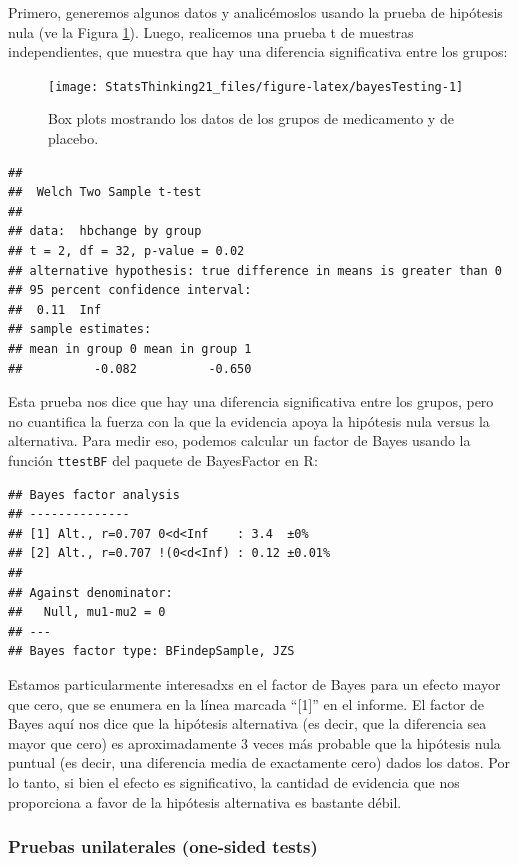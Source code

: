 \documentclass[
  12pt,
]{book}
\begin{document}
Primero, generemos algunos datos y analicémoslos usando la prueba de hipótesis nula (ve la Figura \ref{fig:bayesTesting}). Luego, realicemos una prueba t de muestras independientes, que muestra que hay una diferencia significativa entre los grupos:

\begin{figure}
\texttt{[image: StatsThinking21\_files/figure-latex/bayesTesting-1]} \caption{Box plots mostrando los datos de los grupos de medicamento y de placebo.}\label{fig:bayesTesting}
\end{figure}

\begin{verbatim}
## 
##  Welch Two Sample t-test
## 
## data:  hbchange by group
## t = 2, df = 32, p-value = 0.02
## alternative hypothesis: true difference in means is greater than 0
## 95 percent confidence interval:
##  0.11  Inf
## sample estimates:
## mean in group 0 mean in group 1 
##          -0.082          -0.650
\end{verbatim}

Esta prueba nos dice que hay una diferencia significativa entre los grupos, pero no cuantifica la fuerza con la que la evidencia apoya la hipótesis nula versus la alternativa. Para medir eso, podemos calcular un factor de Bayes usando la función \texttt{ttestBF} del paquete de BayesFactor en R:

\begin{verbatim}
## Bayes factor analysis
## --------------
## [1] Alt., r=0.707 0<d<Inf    : 3.4  ±0%
## [2] Alt., r=0.707 !(0<d<Inf) : 0.12 ±0.01%
## 
## Against denominator:
##   Null, mu1-mu2 = 0 
## ---
## Bayes factor type: BFindepSample, JZS
\end{verbatim}

Estamos particularmente interesadxs en el factor de Bayes para un efecto mayor que cero, que se enumera en la línea marcada ``{[}1{]}'' en el informe. El factor de Bayes aquí nos dice que la hipótesis alternativa (es decir, que la diferencia sea mayor que cero) es aproximadamente 3 veces más probable que la hipótesis nula puntual (es decir, una diferencia media de exactamente cero) dados los datos. Por lo tanto, si bien el efecto es significativo, la cantidad de evidencia que nos proporciona a favor de la hipótesis alternativa es bastante débil.

\hypertarget{pruebas-unilaterales-one-sided-tests}{%
\subsubsection{Pruebas unilaterales (one-sided tests)}\label{pruebas-unilaterales-one-sided-tests}}
\end{document}
